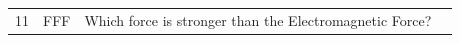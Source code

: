 \documentclass[10pt]{article}
\begin{document}
\begin{tiny}
\begin{longtable}{r p{0.3in} p{1.212in} p{3.8in}}
    11 &          FFF &                                                                                                                                                                                                                          Which force is stronger than the Electromagnetic Force? &                                                                                                                                                                                                                                                                                                                                                                                                                                                                                                                                                                                                                                                                                                                                                                                                                                                                                                                                                                                                                                                                                                                                                                                                                                                                                                                                                                                                                                                                                                                                                                                                                                                                                                                                                                                                                                                                                                                                                                                                                                                                                                                                                                                                                                                                                                                                                                                                                                                                                                                                                                                                                                                                                                                                                                                                                                                                                                                                                                                                                                                                                               
\end{longtable}
\end{tiny}
\end{document}
